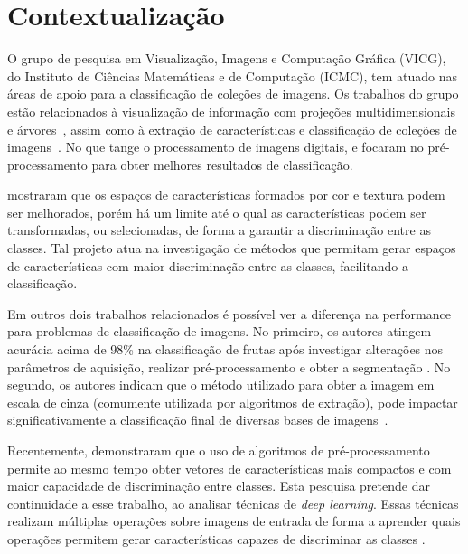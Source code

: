 \section{Contextualização}

O grupo de pesquisa em Visualização, Imagens e Computação Gráfica (VICG), do Instituto de Ciências Matemáticas e de Computação (ICMC), tem atuado nas áreas de apoio para a classificação de coleções de imagens. Os trabalhos do grupo estão relacionados à visualização de informação com projeções multidimensionais e árvores~\cite{Joia2011}, assim como à extração de características e classificação de coleções de imagens~\cite{Paiva2011}. No que tange o processamento de imagens digitais,  e  focaram no pré-processamento para obter melhores resultados de classificação.

 mostraram que os espaços de características formados por cor e textura podem ser melhorados, porém há um limite até o qual as características podem ser transformadas, ou selecionadas, de forma a garantir a discriminação entre as classes. Tal projeto atua na investigação de métodos que permitam gerar espaços de características com maior discriminação entre as classes, facilitando a classificação.

Em outros dois trabalhos relacionados é possível ver a diferença na performance para problemas de classificação de imagens. No primeiro, os autores atingem acurácia acima de 98\% na classificação de frutas após investigar alterações nos parâmetros de aquisição, realizar pré-processamento e obter a segmentação \cite{Rocha2010}. No segundo, os autores indicam que o método utilizado para obter a imagem em escala de cinza (comumente utilizada por algoritmos de extração), pode impactar significativamente a classificação final de diversas bases de imagens~\cite{Kanan2012}.

Recentemente,  demonstraram que o uso de algoritmos de pré\hyp{}processamento permite ao mesmo tempo obter vetores de características mais compactos e com maior capacidade de discriminação entre classes. Esta pesquisa pretende dar continuidade a esse trabalho, ao analisar técnicas de \textit{deep learning}. Essas técnicas realizam múltiplas operações sobre imagens de entrada de forma a aprender quais operações permitem gerar características capazes de discriminar as classes \cite{bengio2009}.


